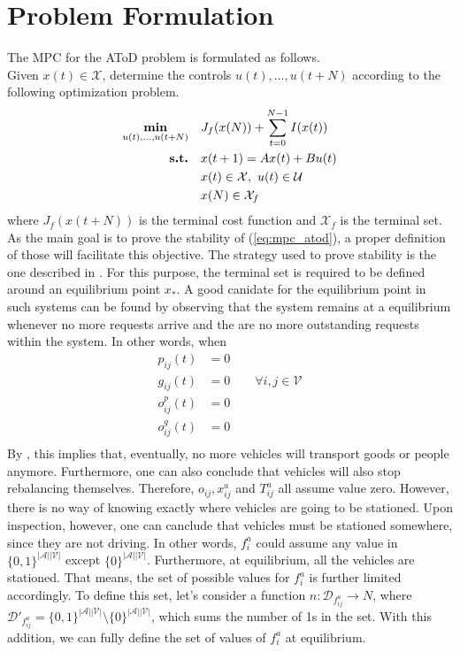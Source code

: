 \section{Problem Formulation}\label{sec:prob_formulat_mpc}
The MPC for the AToD problem is formulated as follows. \\
Given $x(t) \in \mathcal{X}$, determine the controls $u(t), \dots, u(t+N)$ according to the following optimization problem.
\begin{equation}
	\begin{aligned}
		\underset{\substack{u(t), \dots, u(t+N)}}{\text{\textbf{min}}} \quad & J_f(x(N))+\sum_{t=0}^{N-1}I(x(t)) \\
		\text{\textbf{s.t.}} \quad & x(t+1) = Ax(t) + Bu(t)  \\
		& x(t) \in \mathcal{X}, \ u(t)\in \mathcal{U} \\
		&x(N) \in \mathcal{X}_f\\
	\end{aligned}
	\label{eq:mpc_atod}
\end{equation}
where $J_f(x(t+N))$ is the terminal cost function and $\mathcal{X}_f$ is the terminal set. \\
As the main goal is to prove the stability of (\ref{eq:mpc_atod}), a proper definition of those will facilitate this objective. The strategy used to prove stability is the one described in . For this purpose, the terminal set is required to be defined around an equilibrium point $x_*$. A good canidate for the equilibrium point in such systems can be found by observing that the system remains at a equilibrium whenever no more requests arrive and the are no more outstanding requests within the system. In other words, when 
\begin{align*}
	p_{ij}(t) &=0 \\
	g_{ij}(t) &=0\quad\quad \forall i,j\in\mathcal{V}\\
	o^p_{ij}(t) &=0\\
	o^g_{ij}(t) &=0\\
\end{align*}
By , this implies that, eventually, no more vehicles will transport goods or people anymore. Furthermore, one can also conclude that vehicles will also stop rebalancing themselves. Therefore, $o_{ij}, x_{ij}^a$ and $T_{ij}^a$ all assume value zero. However, there is no way of knowing exactly where vehicles are going to be stationed. Upon inspection, however, one can canclude that vehicles must be stationed somewhere, since they are not driving. In other words, $f^a_{i}$ could assume any value in $\{0,1\}^{|\mathcal{A}||\mathcal{V}|} $ except $ \{0\}^{|\mathcal{A}||\mathcal{V}|}$. Furthermore, at equilibrium, all the vehicles are stationed. That means, the set of possible values for  $f^a_{i}$ is further limited accordingly. To define this set, let's consider a function $n : \mathcal{D}_{f^a_{ij}} \rightarrow N$, where $\mathcal{D}'_{f^a_{ij}}  = \{0,1\}^{|\mathcal{A}||\mathcal{V}|} \setminus \{0\}^{|\mathcal{A}||\mathcal{V}|}$, which sums the number of 1s in the set. With this addition, we can fully define the set of values of $f^a_{i}$  at equilibrium. 
